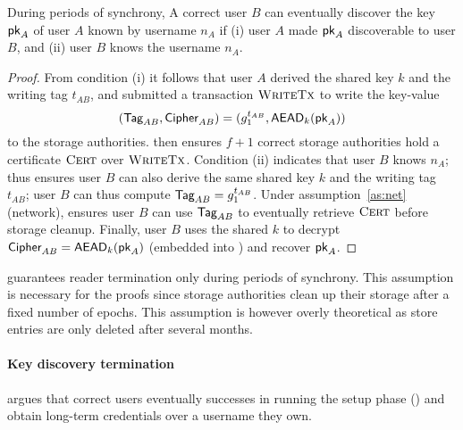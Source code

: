 \begin{theorem} \label{th:reader-termination}
    During periods of synchrony, A correct user $B$ can eventually discover the key $\mathsf{pk}_A$ of user $A$ known by username $n_A$ if (i) user $A$ made $\mathsf{pk}_A$ discoverable to user $B$, and (ii) user $B$ knows the username $n_A$.
\end{theorem}
\begin{proof}
    From condition (i) it follows that user $A$ derived the shared key $k$ and the writing tag $t_{AB}$, and submitted a transaction $\textsc{WriteTx}$ to write the key-value
    $$(\textsf{Tag}_{AB}, \textsf{Cipher}_{AB}) = (g_1^{t_{AB}}, \mathsf{AEAD}_k(\mathsf{pk}_A))$$
    to the storage authorities.
     then ensures $f+1$ correct storage authorities hold a certificate $\textsc{Cert}$ over $\textsc{WriteTx}$.
    Condition (ii) indicates that user $B$ knows $n_A$;  thus ensures user $B$ can also derive the same shared key $k$ and the writing tag $t_{AB}$; user $B$ can thus compute $\textsf{Tag}_{AB} = g_1^{t_{AB}}$.
    Under assumption~\ref{as:net} (network),  ensures user $B$ can use $\textsf{Tag}_{AB}$ to eventually retrieve $\textsc{Cert}$ before storage cleanup.
    Finally, user $B$ uses the shared $k$ to decrypt $\textsf{Cipher}_{AB} = \mathsf{AEAD}_k(\mathsf{pk}_A)$ (embedded into \cert) and recover $\mathsf{pk}_A$.
\end{proof}

 guarantees reader termination only during periods of synchrony. This assumption is necessary for the proofs since storage authorities clean up their storage after a fixed number of epochs. This assumption is however overly theoretical as store entries are only deleted after several months.

\paragraph{Key discovery termination}
 argues that correct users eventually successes in running the setup phase () and obtain long-term credentials over a username they own.

